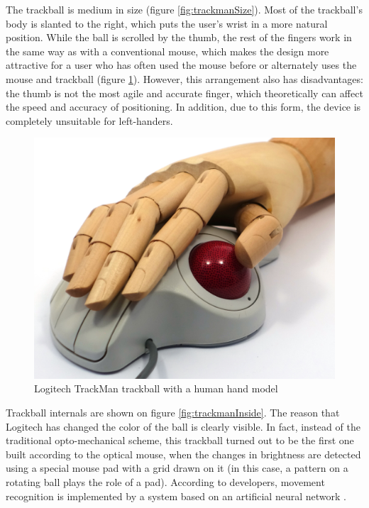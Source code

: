 \documentclass[11pt, a4paper]{article}
\begin{document}
The trackball is medium in size (figure \ref{fig:trackmanSize}). Most of the trackball's body is slanted to the right, which puts the user's wrist in a more natural position. While the ball is scrolled by the thumb, the rest of the fingers work in the same way as with a conventional mouse, which makes the design more attractive for a user who has often used the mouse before or alternately uses the mouse and trackball (figure \ref{fig:trackmanHand}). However, this arrangement also has disadvantages: the thumb is not the most agile and accurate finger, which theoretically can affect the speed and accuracy of positioning. In addition, due to this form, the device is completely unsuitable for left-handers.

\begin{figure}[h]
    \centering
    \includegraphics[scale=0.6]{1995_logitech_trackman/hand_30.jpg}
    \caption{Logitech TrackMan trackball with a human hand model}
    \label{fig:trackmanHand}
\end{figure}

Trackball internals are shown on figure \ref{fig:trackmanInside}. The reason that Logitech has changed the color of the ball is clearly visible. In fact, instead of the traditional opto-mechanical scheme, this trackball turned out to be the first one built according to the optical mouse, when the changes in brightness are detected using a special mouse pad with a grid drawn on it (in this case, a pattern on a rotating ball plays the role of a pad). According to developers, movement recognition is implemented by a system based on an artificial neural network \cite{marbleAdv}.
\end{document}
